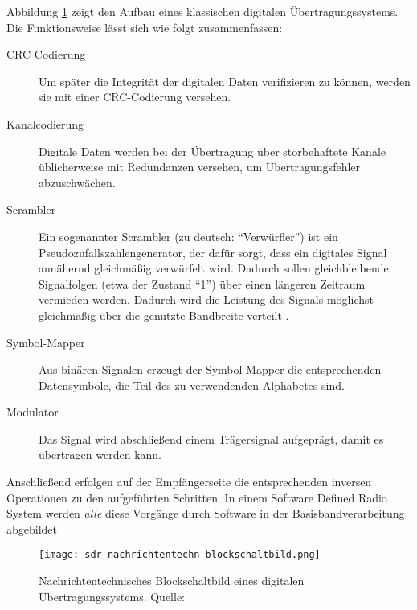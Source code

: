 Abbildung \ref{nachrichtentechn-blockschaltbild} zeigt den Aufbau eines klassischen digitalen Übertragungssystems. Die Funktionsweise lässt sich wie folgt zusammenfassen:
\begin{description}
	\item [CRC Codierung] Um später die Integrität der digitalen Daten verifizieren zu können, werden sie mit einer \ac{CRC}-Codierung versehen.
	\item [Kanalcodierung] Digitale Daten werden bei der Übertragung über störbehaftete Kanäle üblicherweise mit Redundanzen versehen, um Übertragungsfehler abzuschwächen.
	\item [Scrambler] Ein sogenannter Scrambler (zu deutsch: \enquote{Verwürfler}) ist ein Pseudozufallszahlengenerator, der dafür sorgt, dass ein digitales Signal annähernd gleichmäßig verwürfelt wird. Dadurch sollen gleichbleibende Signalfolgen (etwa der Zustand \enquote{1}) über einen längeren Zeitraum vermieden werden. Dadurch wird die Leistung des Signals möglichst gleichmäßig über die genutzte Bandbreite verteilt \cite[vgl. Heuberger, e. a., S. 75]{Heuberger:2017}.
	\item [Symbol-Mapper] Aus binären Signalen erzeugt der Symbol-Mapper die entsprechenden Datensymbole, die Teil des zu verwendenden Alphabetes sind. 
	\item [Modulator] Das Signal wird abschließend einem Trägersignal aufgeprägt, damit es übertragen werden kann.
\end{description}

Anschließend erfolgen auf der Empfängerseite die entsprechenden inversen Operationen zu den aufgeführten Schritten. In einem Software Defined Radio System werden \textit{alle} diese Vorgänge durch Software in der Basisbandverarbeitung abgebildet \cite[vgl. Heuberger, e. a., S. 38]{Heuberger:2017}

\begin{figure}[ht]
	\centering
	\texttt{[image: sdr-nachrichtentechn-blockschaltbild.png]}
	\caption[Nachrichtentechnisches Blockschaltbild eines digitalen Übertragungssystems]{Nachrichtentechnisches Blockschaltbild eines digitalen Übertragungssystems. Quelle: \cite[Heuberger, e. a., S. 38]{Heuberger:2017}}
	\label{nachrichtentechn-blockschaltbild}
\end{figure}






